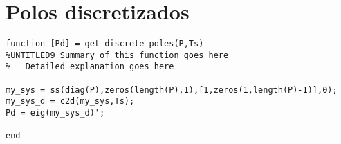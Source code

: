 \chapter{Polos discretizados}

\begin{lstlisting}[frame=single]
function [Pd] = get_discrete_poles(P,Ts)
%UNTITLED9 Summary of this function goes here
%   Detailed explanation goes here

my_sys = ss(diag(P),zeros(length(P),1),[1,zeros(1,length(P)-1)],0);
my_sys_d = c2d(my_sys,Ts);
Pd = eig(my_sys_d)';

end

\end{lstlisting}
 